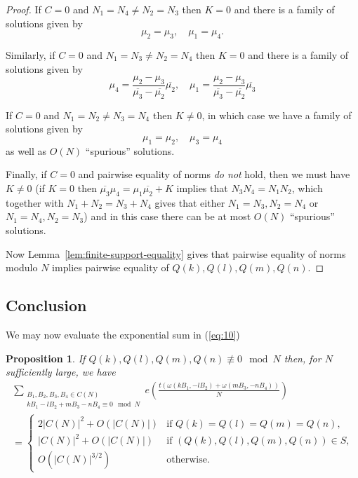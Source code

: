 \documentclass[12pt]{amsart}
\newtheorem{prop}[thm]{Proposition}%
\theoremstyle{plain}
\newcommand{\torus}{C(N)} %
\renewcommand{\^}{\widehat}
\begin{document}
\begin{proof}
If $C=0$ and $N_1=N_4 \neq N_2=N_3$ then $K=0$ and there is a family
of solutions given by 
$$
\mu_2 = \mu_3,  \quad
\mu_1=\mu_4.
$$

Similarly, if $C=0$ and $N_1=N_3 \neq N_2=N_4$ then $K=0$ and 
there is a family of solutions given by 
$$
\mu_4 
=
\frac{\mu_2  - \mu_3}
{\overline{\mu_3} -\overline{\mu_2}}
\overline{\mu_2},
\quad
\mu_1 =
\frac{\mu_2  - \mu_3}
{\overline{\mu_3} -\overline{\mu_2}}
\overline{\mu_3}
$$

If $C=0$ and $N_1=N_2 \neq N_3=N_4$ then $K \neq 0$, in which
case we have a family of solutions given by
$$
\mu_1= \mu_2, \quad \mu_3 = \mu_4
$$
as well as $O(N)$ ``spurious'' solutions.

Finally, if $C=0$ and pairwise equality of norms {\em do not} hold,
then we must have $K \neq 0$
%
(if $K=0$ then $\overline{\mu_3} \mu_4 = \mu_1 \overline{\mu_2}+K$ 
implies that $N_3N_4 = N_1N_2$, which together with $N_1+N_2 =
N_3+N_4$ gives that either $N_1=N_3, N_2=N_4$ or $N_1=N_4, N_2=N_3$)
and in this case there can be at most $O(N)$ ``spurious''
solutions.



Now Lemma~\ref{lem:finite-support-equality} gives 
that pairwise equality of norms modulo $N$
implies pairwise equality of $Q(k), Q(l),Q(m), Q(n)$.
\end{proof}



\subsection{Conclusion}
\label{sec:conclusion}
We may now evaluate the exponential sum in (\ref{eq:10})
\begin{prop} 
\label{prop:fourth-moment-expsum}
If $Q(k), Q(l), Q(m),  Q(n)  \not \equiv 0 \mod N$ then, for $N$
sufficiently large, we have
\begin{multline}
\label{eq:8}
\sum_{\substack{B_1, B_2, B_3, B_4 \in \torus \\
kB_1-lB_2+mB_3-nB_4 \equiv 0 \mod N}}
e \left( \frac{t(\omega(kB_1,-l B_2)+\omega(mB_3,-n B_4))  }{N} \right) 
\\
= \begin{cases}
2 |\torus|^2 + O(|\torus|) & \text{if $Q(k) = Q(l) =  Q(m) = Q(n)$, } \\
|\torus|^2 + O(|\torus|) & \text{if $(Q(k),Q(l),Q(m),Q(n)) \in S$,} \\
O(|\torus|^{3/2}) & \text{otherwise.} 
\end{cases}
\end{multline}
\end{prop}
\end{document}
